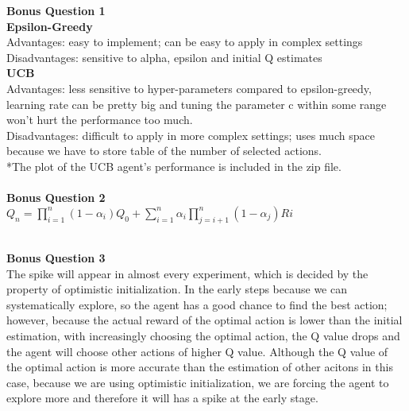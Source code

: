 \documentclass[12pt,a4paper]{article}
\begin{document}
\noindent \textbf{Bonus Question 1}
\ \\

\noindent \textbf{Epsilon-Greedy}\\
Advantages: easy to implement; can be easy to apply in complex settings\\
Disadvantages: sensitive to alpha, epsilon and initial Q estimates
\ \\

\noindent \textbf{UCB}\\
Advantages: less sensitive to hyper-parameters compared to epsilon-greedy, learning rate can be pretty big and tuning the parameter c within some range won't hurt the performance too much.\\
Disadvantages: difficult to apply in more complex settings; uses much space because we have to store table of the number of selected actions.
\ \\
*The plot of the UCB agent's performance is included in the zip file.
\ \\
\ \\
\noindent \textbf{Bonus Question 2}
\ \\

\noindent $ Q_{n} = \prod_{i=1}^{n}(1-\alpha_{i})Q_{0} + \sum_{i=1}^{n}\alpha_{i}\prod_{j=i+1}^{n}(1-\alpha_{j})Ri$

\ \\
\noindent \textbf{Bonus Question 3}\\
The spike will appear in almost every experiment, which is decided by the property of optimistic initialization. In the early steps because we can systematically explore, so the agent has a good chance to find the best action; however, because the actual reward of the optimal action is lower than the initial estimation, with increasingly choosing the optimal action, the Q value drops and the agent will choose other actions of higher Q value. Although the Q value of the optimal action is more accurate than the estimation of other acitons in this case, because we are using optimistic initialization, we are forcing the agent to explore more and therefore it will has a spike at the early stage.
\end{document}
